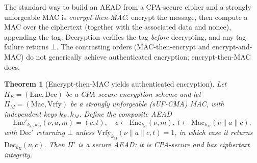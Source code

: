\documentclass[11pt,a4paper]{article}
\newtheorem{theorem}{Theorem}[section]
\theoremstyle{definition}
\theoremstyle{remark}
\begin{document}
The standard way to build an AEAD from a CPA-secure cipher and a strongly unforgeable MAC is \emph{encrypt-then-MAC}: encrypt the message, then compute a MAC over the ciphertext (together with the associated data and nonce), appending the tag. Decryption verifies the tag \emph{before} decrypting, and any tag failure returns \(\bot\). The contrasting orders (MAC-then-encrypt and encrypt-and-MAC) do not generically achieve authenticated encryption; encrypt-then-MAC does.

\begin{theorem}[Encrypt-then-MAC yields authenticated encryption]\label{symmetric:thm-etm}
Let \(\Pi_E = (\mathrm{Enc}, \mathrm{Dec})\) be a CPA-secure encryption scheme and let \(\Pi_M = (\mathrm{Mac}, \mathrm{Vrfy})\) be a strongly unforgeable (sUF-CMA) MAC, with independent keys \(k_E, k_M\). Define the composite AEAD
\[
  \mathrm{Enc}'_{k_E,k_M}(\nu,a,m) = (c, t), \quad c \leftarrow \mathrm{Enc}_{k_E}(\nu,m),\ t \leftarrow \mathrm{Mac}_{k_M}(\nu \| a \| c),
\]
with \(\mathrm{Dec}'\) returning \(\bot\) unless \(\mathrm{Vrfy}_{k_M}(\nu\|a\|c, t) = 1\), in which case it returns \(\mathrm{Dec}_{k_E}(\nu, c)\). Then \(\Pi'\) is a secure AEAD: it is CPA-secure and has ciphertext integrity.
\end{theorem}
\end{document}
